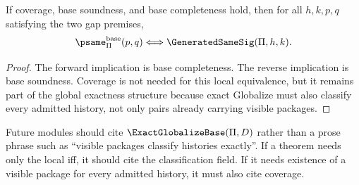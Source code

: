 \begin{proposition}
\label{prop:v155-iff-derived}
If coverage, base soundness, and base completeness hold, then for all \(h,k,p,q\) satisfying the two gap premises,
\[
  \psame_{\Pi}^{\mathrm{base}}(p,q)\Longleftrightarrow \GeneratedSameSig(\Pi,h,k).
\]
\end{proposition}

\begin{proof}
The forward implication is base completeness. The reverse implication is base soundness. Coverage is not needed for this local equivalence, but it remains part of the global exactness structure because exact Globalize must also classify every admitted history, not only pairs already carrying visible packages.
\end{proof}

\begin{protocol}
\label{prot:v155-export-replacement}
Future modules should cite \(\ExactGlobalizeBase(\Pi,D)\) rather than a prose phrase such as ``visible packages classify histories exactly''. If a theorem needs only the local iff, it should cite the classification field. If it needs existence of a visible package for every admitted history, it must also cite coverage.
\end{protocol}
